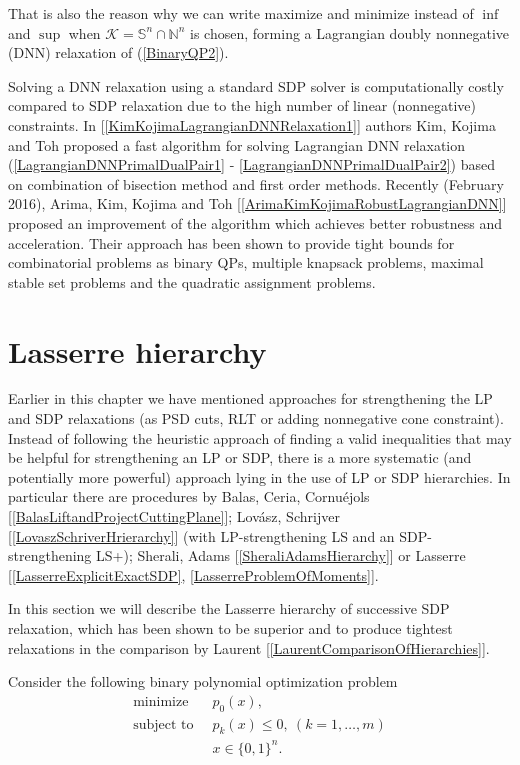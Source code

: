 \documentclass[12pt]{book}
\theoremstyle{definition}
\begin{document}
That is also the reason why we can write maximize and minimize instead of $\inf$ and $\sup$ when 
$\mathcal{K} = \mathbb{S}^n \cap \mathbb{N}^n$ is chosen, forming a Lagrangian doubly nonnegative (DNN) relaxation of (\ref{BinaryQP2}).

Solving a DNN relaxation using a standard SDP solver is computationally costly compared to SDP relaxation due to the high number of linear (nonnegative) constraints. In [\ref{KimKojimaLagrangianDNNRelaxation1}] authors Kim, Kojima and Toh proposed a fast algorithm for solving Lagrangian DNN relaxation (\ref{LagrangianDNNPrimalDualPair1} - \ref{LagrangianDNNPrimalDualPair2}) based on combination of bisection method and first order methods. Recently (February 2016), Arima, Kim, Kojima and Toh [\ref{ArimaKimKojimaRobustLagrangianDNN}] proposed an improvement of the algorithm which achieves better robustness and acceleration. Their approach has been shown to provide tight bounds for combinatorial problems as binary QPs, multiple knapsack problems, maximal stable set problems and the quadratic assignment problems.
 


\section{Lasserre hierarchy}


Earlier in this chapter we have mentioned approaches for strengthening the LP and SDP relaxations (as PSD cuts, RLT or adding nonnegative cone constraint). 
Instead of following the heuristic approach of finding a valid inequalities that may be helpful
for strengthening an LP or SDP, there is a more systematic (and potentially more powerful) approach
lying in the use of LP or SDP hierarchies. In particular there are procedures
by Balas, Ceria, Cornuéjols [\ref{BalasLiftandProjectCuttingPlane}]; Lovász, Schrijver [\ref{LovaszSchriverHrierarchy}] (with LP-strengthening LS
and an SDP-strengthening LS+); Sherali, Adams [\ref{SheraliAdamsHierarchy}] or Lasserre [\ref{LasserreExplicitExactSDP}, \ref{LasserreProblemOfMoments}].  

In this section we will describe the Lasserre hierarchy of successive SDP relaxation, which has been shown to be superior and to produce tightest relaxations in the comparison by Laurent [\ref{LaurentComparisonOfHierarchies}].


Consider the following binary polynomial optimization problem
\begin{equation}
\label{POP1}
\begin{array}{ll}
\mbox{minimize }   & \ p_0(x), 	\\
\mbox{subject to } & \ p_k(x)\leq 0, \ (k=1,\dots ,m) 	\\
		   & \ x\in\{ 0, 1 \}^n.
\end{array}
\end{equation}
\end{document}
